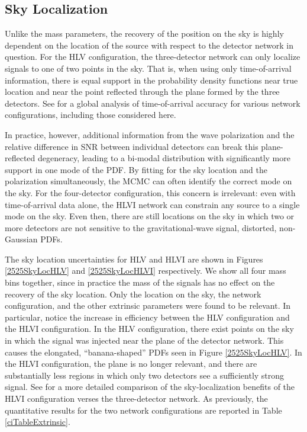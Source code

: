 \documentclass[11pt,a4paper]{emulateapj}
\begin{document}
\subsection{Sky Localization}
\label{skySection}
 
Unlike the mass parameters, the recovery of the position on the sky is highly dependent 
on the location of the source with respect to the detector network in question. 
For the HLV configuration, the three-detector network can only localize signals to one of
two points in the sky.  That is, when using only time-of-arrival information, there is 
equal support in the probability density functions near true location and near the 
point reflected through the plane formed by the three detectors.  See  \cite{Fairhurst2011} for
 a global analysis of time-of-arrival accuracy for various network configurations, including those considered
 here.  
  
  
  In practice, however, additional information from the wave polarization and the relative difference
  in SNR between individual detectors can break this plane-reflected degeneracy,
   leading to a bi-modal distribution with significantly more support in one mode of the PDF.
     By fitting for the sky location and the polarization simultaneously, the MCMC can often identify
   the correct mode on the sky.  For the four-detector configuration, this concern is irrelevant: even with time-of-arrival
   data alone, the HLVI network can constrain any source to a single mode on the sky.  Even then, there are still locations 
   on the sky in which two or more detectors are not sensitive to the gravitational-wave signal, distorted, non-Gaussian PDFs.  

The sky location uncertainties for HLV and HLVI are shown in Figures \ref{2525SkyLocHLV}
 and \ref{2525SkyLocHLVI} respectively.  We show all four mass bins together, since in practice
  the mass of the signals has no effect on the recovery of the sky location.  Only the location on 
  the sky, the network configuration, and the other extrinsic parameters were found to be relevant.  
  In particular, notice the increase in efficiency between the HLV configuration and the HLVI 
  configuration.  In the HLV configuration, there exist points on the sky in which the signal was injected
  near the plane of the detector network.  This causes the elongated, ``banana-shaped'' PDFs seen in
  Figure \ref{2525SkyLocHLV}.  In the HLVI configuration, the plane is no longer relevant, and there are substantially
  less regions in which only two detectors see a sufficiently strong signal.  
  See \cite{Veitch2012} for a more detailed comparison of the sky-localization benefits of the HLVI 
  configuration verses the three-detector network.  As previously, the quantitative results for the two network configurations
  are reported in Table \ref{ciTableExtrinsic}.
\end{document}
